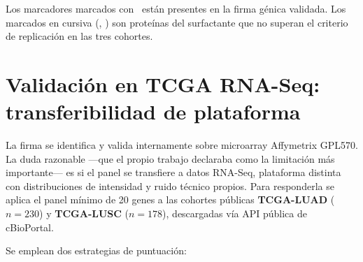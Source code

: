 \begin{table}[H]
  \centering
  \small
  \caption{Panel IHC clínico (OMS 2015) frente a la firma génica
  validada.}
  \label{tab:ihc_lado_a_lado}

  \vspace{0.35em}
  {\footnotesize Los marcadores marcados con \checkmark\ están presentes
  en la firma génica validada. Los marcados en cursiva (,
  ) son proteínas del surfactante que no superan el
  criterio de replicación en las tres cohortes.}
\end{table}

\section{Validación en TCGA RNA-Seq: transferibilidad de plataforma}
\label{sec:res_tcga}

La firma se identifica y valida internamente sobre microarray Affymetrix
GPL570. La duda razonable —que el propio trabajo declaraba como la
limitación más importante— es si el panel se transfiere a datos RNA-Seq,
plataforma distinta con distribuciones de intensidad y ruido técnico
propios. Para responderla se aplica el panel mínimo de 20 genes a las
cohortes públicas \textbf{TCGA-LUAD} ($n=230$) y \textbf{TCGA-LUSC}
($n=178$), descargadas vía API pública de cBioPortal.

Se emplean dos estrategias de puntuación:

